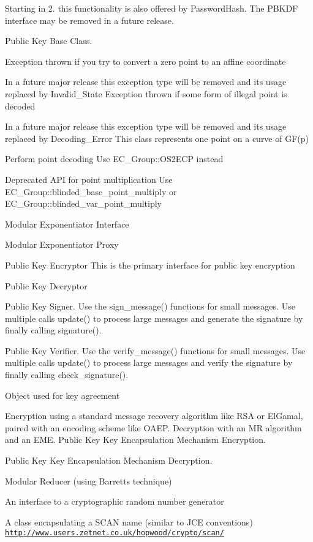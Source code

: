 Starting in 2. this functionality is also offered by Password\+Hash. The P\+B\+K\+DF interface may be removed in a future release.

Public Key Base Class.

Exception thrown if you try to convert a zero point to an affine coordinate

In a future major release this exception type will be removed and its usage replaced by Invalid\+\_\+\+State Exception thrown if some form of illegal point is decoded

In a future major release this exception type will be removed and its usage replaced by Decoding\+\_\+\+Error This class represents one point on a curve of G\+F(p)

Perform point decoding Use E\+C\+\_\+\+Group\+::\+O\+S2\+E\+CP instead

Deprecated A\+PI for point multiplication Use E\+C\+\_\+\+Group\+::blinded\+\_\+base\+\_\+point\+\_\+multiply or E\+C\+\_\+\+Group\+::blinded\+\_\+var\+\_\+point\+\_\+multiply

Modular Exponentiator Interface

Modular Exponentiator Proxy

Public Key Encryptor This is the primary interface for public key encryption

Public Key Decryptor

Public Key Signer. Use the sign\+\_\+message() functions for small messages. Use multiple calls update() to process large messages and generate the signature by finally calling signature().

Public Key Verifier. Use the verify\+\_\+message() functions for small messages. Use multiple calls update() to process large messages and verify the signature by finally calling check\+\_\+signature().

Object used for key agreement

Encryption using a standard message recovery algorithm like R\+SA or El\+Gamal, paired with an encoding scheme like O\+A\+EP. Decryption with an MR algorithm and an E\+ME. Public Key Key Encapsulation Mechanism Encryption.

Public Key Key Encapsulation Mechanism Decryption.

Modular Reducer (using Barrett\textquotesingle{}s technique)

An interface to a cryptographic random number generator

A class encapsulating a S\+C\+AN name (similar to J\+CE conventions) \href{http://www.users.zetnet.co.uk/hopwood/crypto/scan/}{\tt http\+://www.\+users.\+zetnet.\+co.\+uk/hopwood/crypto/scan/}

